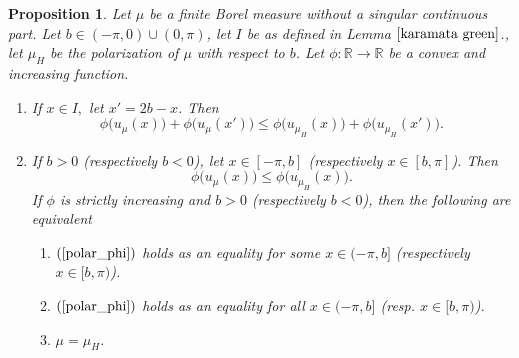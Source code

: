 \documentclass[11pt]{amsart}
\newtheorem{proposition}[theorem]{Proposition}
\numberwithin{equation}{section}
\begin{document}
\begin{proposition}\label{Karamataphi}
Let \(\mu\) be a finite Borel measure without a singular continuous part. Let \(b\in(-\pi,0)\cup(0,\pi)\), let \(I\) be as defined in Lemma \(\ref{karamata green}\)., let \(\mu_H\) be the polarization of \(\mu\) with respect to \(b\). Let \(\phi:\mathbb{R}\to\mathbb{R}\) be a convex and increasing function.
\begin{enumerate}
    \item[(a)] If \(x\in I,\) let \(x'=2b-x\). Then 
    \begin{equation}\label{karamata_phi}
        \phi\bigl(u_\mu(x)\bigr)+\phi\bigl(u_\mu(x')\bigr)\leq\phi\bigl(u_{\mu_H}(x)\bigr)+\phi\bigl(u_{\mu_H}(x')\bigr).
    \end{equation}
    \item[(b)] If \(b>0\) (respectively \(b<0\)), let \(x\in[-\pi,b]\) (respectively \(x\in[b,\pi]\)). Then
    \begin{equation}\label{polar_phi}
        \phi\bigl(u_\mu(x)\bigr)\leq\phi\bigl(u_{\mu_H}(x)\bigr).
    \end{equation}
    If \(\phi\) is strictly increasing and \(b>0\) (respectively \(b<0\)), then the following are equivalent
        \begin{enumerate}
        \item[(i)] \((\ref{polar_phi})\) holds as an equality for some \(x\in(-\pi,b]\) (respectively \(x\in[b,\pi)\)).
        \item[(ii)] \((\ref{polar_phi})\) holds as an equality for all \(x\in(-\pi,b]\) (resp. \(x\in[b,\pi)\)).
        \item[(iii)] \(\mu=\mu_H\).
        \end{enumerate}
    \end{enumerate}
\end{proposition}
\end{document}
